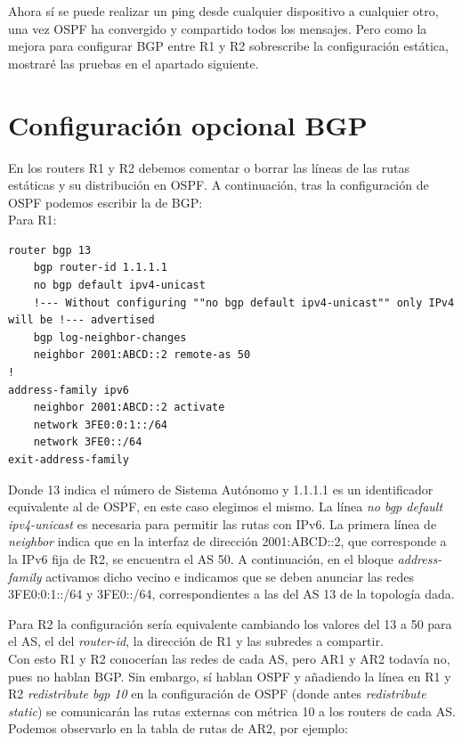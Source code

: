 \documentclass{article}
\begin{document}
Ahora sí se puede realizar un ping desde cualquier dispositivo a cualquier otro, una vez OSPF ha convergido y compartido todos los mensajes. Pero como la mejora para configurar BGP entre R1 y R2 sobrescribe la configuración estática, mostraré las pruebas en el apartado siguiente.


\section{Configuración opcional BGP}
En los routers R1 y R2 debemos comentar o borrar las líneas de las rutas estáticas y su distribución en OSPF. A continuación, tras la configuración de OSPF podemos escribir la de BGP:
\\

Para R1:
\begin{lstlisting}
router bgp 13
	bgp router-id 1.1.1.1
	no bgp default ipv4-unicast
	!--- Without configuring ""no bgp default ipv4-unicast"" only IPv4 will be !--- advertised
	bgp log-neighbor-changes
	neighbor 2001:ABCD::2 remote-as 50
!
address-family ipv6
	neighbor 2001:ABCD::2 activate
	network 3FE0:0:1::/64
	network 3FE0::/64
exit-address-family
\end{lstlisting}

Donde 13 indica el número de Sistema Autónomo y 1.1.1.1 es un identificador equivalente al de OSPF, en este caso elegimos el mismo. La línea \textit{no bgp default ipv4-unicast} es necesaria para permitir las rutas con IPv6. La primera línea de \textit{neighbor} indica que en la interfaz de dirección 2001:ABCD::2, que corresponde a la IPv6 fija de R2, se encuentra el AS 50. A continuación, en el bloque \textit{address-family} activamos dicho vecino e indicamos que se deben anunciar las redes 3FE0:0:1::/64 y 3FE0::/64, correspondientes a las del AS 13 de la topología dada.

Para R2 la configuración sería equivalente cambiando los valores del 13 a 50 para el AS, el del \textit{router-id}, la dirección de R1 y las subredes a compartir.
\\

Con esto R1 y R2 conocerían las redes de cada AS, pero AR1 y AR2 todavía no, pues no hablan BGP. Sin embargo, sí hablan OSPF y añadiendo la línea en R1 y R2 \textit{redistribute bgp 10} en la configuración de OSPF (donde antes \textit{redistribute static}) se comunicarán las rutas externas con métrica 10 a los routers de cada AS. Podemos observarlo en la tabla de rutas de AR2, por ejemplo:
\end{document}
